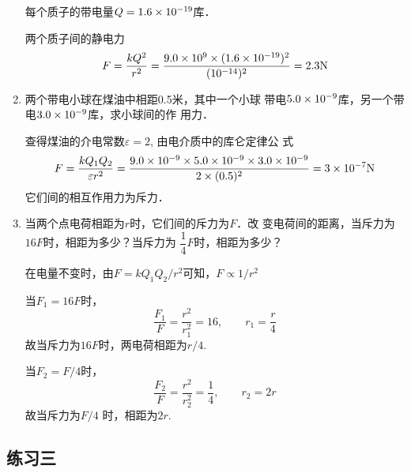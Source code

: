 \begin{enumerate}
\begin{solution}
    每个质子的带电量$Q=1.6\times10^{-19}$库．

    两个质子间的静电力
    \[F=\frac{kQ^2}{r^2}=\frac{9.0\times10^9\times(1.6\times10^{-19})^2}{(10^{-14})^2}=2.3{\rm N}\]
\end{solution}

\item 两个带电小球在煤油中相距0.5米，其中一个小球
带电$5.0\times10^{-9}$库，另一个带电$3.0\times10^{-9}$库，求小球间的作
用力．

\begin{solution}
    查得煤油的介电常数$\varepsilon=2$, 由电介质中的库仑定律公
    式
    \[F=\frac{kQ_1Q_2}{\varepsilon r^2}=\frac{9.0\times10^{-9}\times 5.0\times10^{-9}\times 3.0\times10^{-9}}{2\times (0.5)^2}=3\times 10^{-7}{\rm N}\]
    它们间的相互作用力为斥力．
\end{solution}

\item 当两个点电荷相距为$r$时，它们间的斥力为$F$．改
变电荷间的距离，当斥力为$16F$时，相距为多少？当斥力为
$\dfrac{1}{4}F$时，相距为多少？

\begin{solution}
    在电量不变时，由$F=kQ_1Q_2/r^2$可知，$F\propto 1/r^2$
    
    当$F_1=16F$时，
    \[\frac{F_1}{F}=\frac{r^2}{r^2_1}=16,\qquad r_1=\frac{r}{4}\]
    故当斥力为$16F$时，两电荷相距为$r/4$.
    
    当$F_2=F/4$时，
\[\frac{F_2}{F}=\frac{r^2}{r^2_2}=\frac{1}{4},\qquad r_2=2r\]
    故当斥力为$F/4$
    时，相距为$2r$.
\end{solution}

\end{enumerate}

\subsection{练习三}

